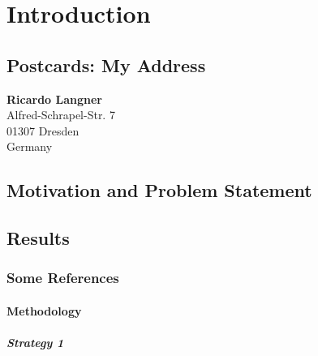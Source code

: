 \chapter{Introduction}
\label{sec:intro}


\Blindtext[2][2]

\section{Postcards: My Address}
\label{sec:intro:address}
\noindent   %
\textbf{Ricardo Langner} \\
Alfred-Schrapel-Str. 7 \\
01307 Dresden \\
Germany


\section{Motivation and Problem Statement}
\label{sec:intro:motivation}

\Blindtext[3][1] \cite{Jurgens:2000,Jurgens:1995,Miede:2011,Kohm:2011,Apple:keynote:2010,Apple:numbers:2010,Apple:pages:2010}

\section{Results}
\label{sec:intro:results}

\Blindtext[1][2]

\subsection{Some References}
\label{sec:intro:results:refs}

\cite{WEB:GNU:GPL:2010,WEB:Miede:2011}
\Blindtext[1][1]

\subsubsection{Methodology}
\label{sec:intro:results:refs:method}

\Blindtext[1][2]

\paragraph{Strategy 1}
\Blindtext[1][1]

